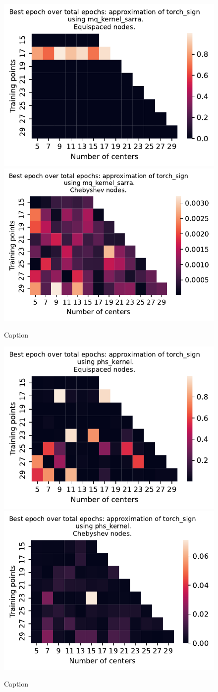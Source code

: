 \documentclass[12pt]{report} %
\begin{document}
\begin{figure}[ht]
    \centering
    
    \includegraphics[width=.49\textwidth]{imagenes/experiments/1d/variational_epochs/torch_sign-Kmq_kernel_sarra-Equi-epochs.pdf}
    \includegraphics[width=.49\textwidth]{imagenes/experiments/1d/variational_epochs/torch_sign-Kmq_kernel_sarra-Cheb-epochs.pdf}
    \caption{Caption}
    \label{fig:epochs-torch-sign-sarra}
\end{figure}


\begin{figure}[ht]
    \centering
    \includegraphics[width=.49\textwidth]{imagenes/experiments/1d/variational_epochs/torch_sign-Kphs_kernel-Equi-epochs.pdf}
    \includegraphics[width=.49\textwidth]{imagenes/experiments/1d/variational_epochs/torch_sign-Kphs_kernel-Cheb-epochs.pdf}
    \caption{Caption}
    \label{fig:epochs-torch-sign-phs}
\end{figure}
\end{document}
